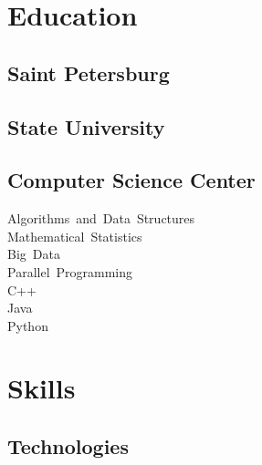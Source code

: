 \documentclass[letterpaper]{deedy-resume} %
\begin{document}
\begin{minipage}[t][0.75\textheight][t]{0.33\textwidth} %


\section{Education} 
\sectionspace

\subsection{Saint Petersburg}
\subsection{State University}
\sectionspace
{}


\sectionspace

\subsection{Computer Science Center}
\sectionspace

Algorithms~and~Data~Structures \\
Mathematical~Statistics \\
Big~Data \\
Parallel~Programming \\
C++ \\
Java \\
Python


\sectionspace


\section{Skills}
\sectionspace

\subsection{Technologies}
\sectionspace


\end{minipage}
\end{document}

